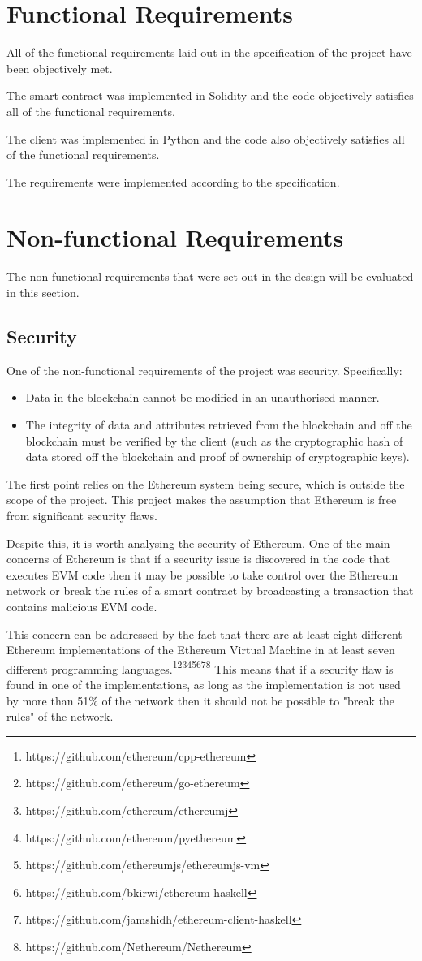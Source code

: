 \documentclass[12pt]{report}
\begin{document}
	\section{Functional Requirements}
	All of the functional requirements laid out in the specification of the project have been objectively met.
	
	The smart contract was implemented in Solidity and the code objectively satisfies all of the functional requirements.
	
	The client was implemented in Python and the code also objectively satisfies all of the functional requirements.
	
	The requirements were implemented according to the specification.
	\section{Non-functional Requirements}
	The non-functional requirements that were set out in the design will be evaluated in this section.
	
	\subsection{Security}
	One of the non-functional requirements of the project was security. Specifically:
	\begin{itemize}
		\item Data in the blockchain cannot be modified in an unauthorised manner.
		\item The integrity of data and attributes retrieved from the blockchain and off the blockchain must be verified by the client (such as the cryptographic hash of data stored off the blockchain and proof of ownership of cryptographic keys).
	\end{itemize}
	
	The first point relies on the Ethereum system being secure, which is outside the scope of the project. This project makes the assumption that Ethereum is free from significant security flaws.
	
	Despite this, it is worth analysing the security of Ethereum. One of the main concerns of Ethereum is that if a security issue is discovered in the code that executes EVM code then it may be possible to take control over the Ethereum network or break the rules of a smart contract by broadcasting a transaction that contains malicious EVM code.
	
	This concern can be addressed by the fact that there are at least eight different Ethereum implementations of the Ethereum Virtual Machine in at least seven different programming languages.\footnote{https://github.com/ethereum/cpp-ethereum}\footnote{https://github.com/ethereum/go-ethereum}\footnote{https://github.com/ethereum/ethereumj}\footnote{https://github.com/ethereum/pyethereum}\footnote{https://github.com/ethereumjs/ethereumjs-vm}\footnote{https://github.com/bkirwi/ethereum-haskell}\footnote{https://github.com/jamshidh/ethereum-client-haskell}\footnote{https://github.com/Nethereum/Nethereum} This means that if a security flaw is found in one of the implementations, as long as the implementation is not used by more than 51\% of the network then it should not be possible to "break the rules" of the network.
	
\end{document}
